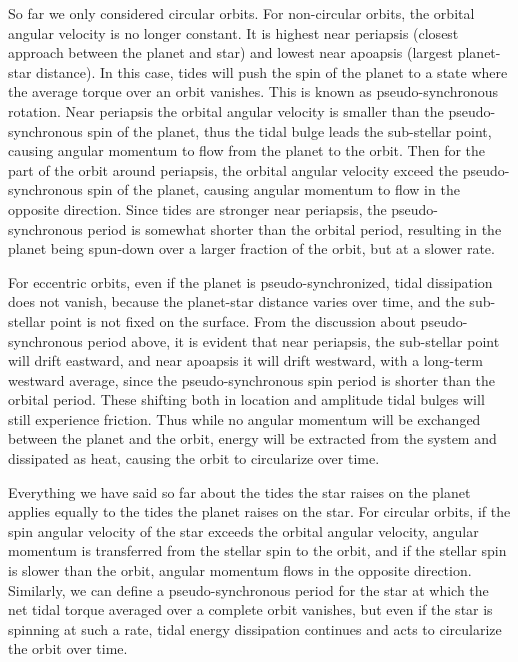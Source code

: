 So far we only considered circular orbits. For non-circular orbits, the orbital
angular velocity is no longer constant. It is highest near periapsis (closest
approach between the planet and star) and lowest near apoapsis (largest
planet-star distance). In this case, tides will push the spin of the planet to a
state where the average torque over an orbit vanishes. This is known as
pseudo-synchronous rotation. Near periapsis the orbital angular velocity is
smaller than the pseudo-synchronous spin of the planet, thus the tidal bulge
leads the sub-stellar point, causing angular momentum to flow from the planet to
the orbit. Then for the part of the orbit around periapsis, the orbital angular
velocity exceed the pseudo-synchronous spin of the planet, causing angular
momentum to flow in the opposite direction. Since tides are stronger near
periapsis, the pseudo-synchronous period is somewhat shorter than the orbital
period, resulting in the planet being spun-down over a larger fraction of the
orbit, but at a slower rate.

For eccentric orbits, even if the planet is pseudo-synchronized, tidal
dissipation does not vanish, because the planet-star distance varies over time,
and the sub-stellar point is not fixed on the surface. From the discussion about
pseudo-synchronous period above, it is evident that near periapsis, the
sub-stellar point will drift eastward, and near apoapsis it will drift westward,
with a long-term westward average, since the pseudo-synchronous spin period is
shorter than the orbital period. These shifting both in location and amplitude
tidal bulges will still experience friction. Thus while no angular momentum will
be exchanged between the planet and the orbit, energy will be extracted from
the system and dissipated as heat, causing the orbit to circularize over time.

Everything we have said so far about the tides the star raises on the planet
applies equally to the tides the planet raises on the star. For circular orbits,
if the spin angular velocity of the star exceeds the orbital angular velocity,
angular momentum is transferred from the stellar spin to the orbit, and if the
stellar spin is slower than the orbit, angular momentum flows in the opposite
direction. Similarly, we can define a pseudo-synchronous period for the star at
which the net tidal torque averaged over a complete orbit vanishes, but even if
the star is spinning at such a rate, tidal energy dissipation continues and acts
to circularize the orbit over time.
